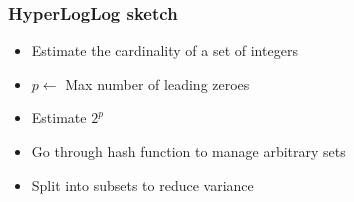 \documentclass[12pt,aspectratio=169]{beamer}
\begin{document}
\begin{frame}\frametitle{HyperLogLog sketch}
\begin{itemize}
\item
    Estimate the cardinality of a set of integers
\item
    $p\gets$ Max number of leading zeroes
\item
    Estimate $2^{p}$
\item
    Go through hash function to manage arbitrary sets
\item
    Split into subsets to reduce variance
\end{itemize}
\end{frame}
\end{document}
